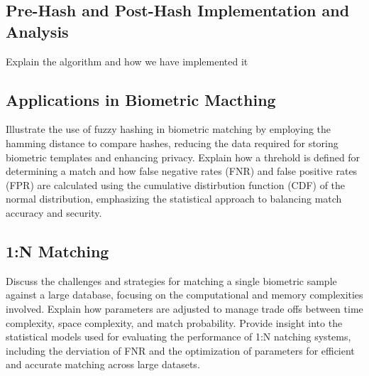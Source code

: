 \subsection{Pre-Hash and Post-Hash Implementation and Analysis}
Explain the algorithm and how we have implemented it

\subsection{Applications in Biometric Macthing}
Illustrate the use of fuzzy hashing in biometric matching by employing the hamming distance to compare hashes, reducing the data required for storing biometric templates and enhancing privacy. Explain how a threhold is defined for determining a match and how false negative rates (FNR) and false positive rates (FPR) are calculated using the cumulative distirbution function (CDF) of the normal distribution, emphasizing the statistical approach to balancing match accuracy and security. 

\subsection{1:N Matching}
Discuss the challenges and strategies for matching a single biometric sample against a large database, focusing on the computational and memory complexities involved. Explain how parameters are adjusted to manage trade offs between time complexity, space complexity, and match probability. Provide insight into the statistical models used for evaluating the performance of 1:N natching systems, including the derviation of FNR and the optimization of parameters for efficient and accurate matching across large datasets. 



